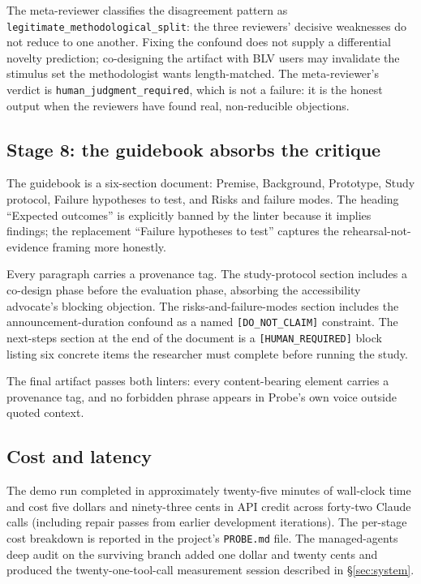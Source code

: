 The meta-reviewer classifies the disagreement pattern as \texttt{legitimate\_methodological\_split}: the three reviewers' decisive weaknesses do not reduce to one another. Fixing the confound does not supply a differential novelty prediction; co-designing the artifact with BLV users may invalidate the stimulus set the methodologist wants length-matched. The meta-reviewer's verdict is \texttt{human\_judgment\_required}, which is not a failure: it is the honest output when the reviewers have found real, non-reducible objections.

\subsection{Stage 8: the guidebook absorbs the critique}

The guidebook is a six-section document: Premise, Background, Prototype, Study protocol, Failure hypotheses to test, and Risks and failure modes. The heading ``Expected outcomes'' is explicitly banned by the linter because it implies findings; the replacement ``Failure hypotheses to test'' captures the rehearsal-not-evidence framing more honestly.

Every paragraph carries a provenance tag. The study-protocol section includes a co-design phase before the evaluation phase, absorbing the accessibility advocate's blocking objection. The risks-and-failure-modes section includes the announcement-duration confound as a named \texttt{[DO\_NOT\_CLAIM]} constraint. The next-steps section at the end of the document is a \texttt{[HUMAN\_REQUIRED]} block listing six concrete items the researcher must complete before running the study.

The final artifact passes both linters: every content-bearing element carries a provenance tag, and no forbidden phrase appears in Probe's own voice outside quoted context.

\subsection{Cost and latency}

The demo run completed in approximately twenty-five minutes of wall-clock time and cost five dollars and ninety-three cents in API credit across forty-two Claude calls (including repair passes from earlier development iterations). The per-stage cost breakdown is reported in the project's \texttt{PROBE.md} file. The managed-agents deep audit on the surviving branch added one dollar and twenty cents and produced the twenty-one-tool-call measurement session described in \S\ref{sec:system}.
